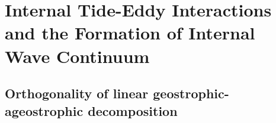 \documentclass[../Rajarshi-thesis-draft.tex]{subfiles}
\begin{document}
\appendix


\chapter{Internal Tide-Eddy Interactions and the Formation of Internal Wave Continuum}
\begingroup


\section{Orthogonality of linear geostrophic-ageostrophic decomposition}\label{edwv-budet}

\end{document}
